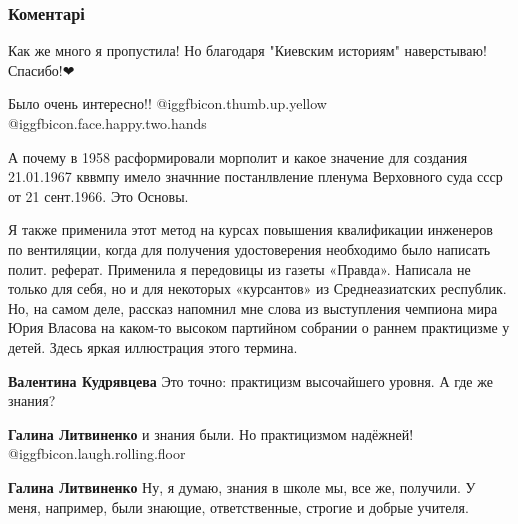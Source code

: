  
 
 
 
 
\subsubsection{Коментарі}

\begin{itemize} %

Как же много я пропустила! Но благодаря "Киевским историям" наверстываю! Спасибо!❤

Было очень интересно!! @igg{fbicon.thumb.up.yellow}   @igg{fbicon.face.happy.two.hands} 


А почему в 1958 расформировали морполит и какое значение для создания
21.01.1967 кввмпу имело значнние постанлвление пленума Верховного суда ссср от
21 сент.1966. Это Основы.


Я также применила этот метод на курсах повышения квалификации инженеров по
вентиляции, когда для получения удостоверения необходимо было написать полит.
реферат. Применила я передовицы из газеты «Правда». Написала не только для
себя, но и для некоторых «курсантов» из Среднеазиатских республик. Но, на самом
деле, рассказ напомнил мне слова из выступления чемпиона мира Юрия Власова на
каком-то высоком партийном собрании о раннем практицизме у детей. Здесь яркая
иллюстрация этого термина.

\begin{itemize} %
\textbf{Валентина Кудрявцева} Это точно: практицизм высочайшего уровня. А где же знания?

\begin{itemize} %

\textbf{Галина Литвиненко} и знания были. Но практицизмом надёжней! @igg{fbicon.laugh.rolling.floor} 

\textbf{Галина Литвиненко} Ну, я думаю, знания в школе мы, все же, получили. У меня, например, были знающие, ответственные, строгие и добрые учителя.


\end{itemize}
\end{itemize}
\end{itemize}
